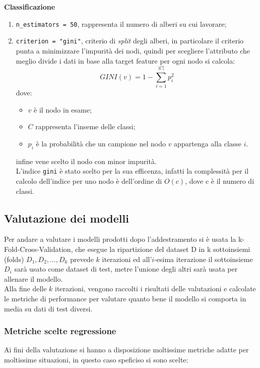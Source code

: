 \documentclass[italian,12pt,a4paper]{article}
\begin{document}
			\textbf{Classificazione}
			
				\begin{enumerate}
					
					\item \texttt{n\_estimators = 50}, rappresenta il numero di alberi su cui lavorare;
					\item  \texttt{criterion = "gini"}, criterio di \textit{split} degli alberi, in particolare il criterio punta a minimizzare l'impurità dei nodi, quindi per scegliere l'attributo che meglio divide i dati in base alla target feature per ogni nodo si calcola:
					$$GINI(v) = 1-\sum_{i = 1}^{|C|}p_i^2$$
					dove:
					\begin{itemize}
						\item $v$ è il nodo in esame;
						\item $C$ rappresenta l'inseme delle classi;
						\item $p_i$ è la probabilità che un campione nel nodo $v$ appartenga alla classe $i$.
					\end{itemize}
					infine vene scelto il nodo con minor impurità. \\
					\linebreak
					L'indice \texttt{gini} è stato scelto per la sua efficenza, infatti la complessità per il calcolo dell'indice per uno nodo è dell'ordine di $O(c)$, dove c è il numero di classi.
					
				\end{enumerate}
				
		\subsection{Valutazione dei modelli}
			Per andare a valutare i modelli prodotti dopo l'addestramento si è usata la k-Fold-Cross-Validation, che esegue la ripartizione del dataset D in k sottoinsiemi (folds) $D_1, D_2, \dots , D_k$ prevede $k$ iterazioni ed all'$i$-esima iterazione il sottoinsieme $D_i$ sarà usato come dataset di test, metre l'unione degli altri sarà usata per allenare il modello. \\
			\linebreak
			Alla fine delle $k$ iterazioni, vengono raccolti i risultati delle valutazioni e calcolate le metriche di performance per valutare quanto bene il modello si comporta in media su dati di test diversi.
			
			\subsubsection{Metriche scelte regressione}
				Ai fini della valutazione si hanno a disposizione moltissime metriche adatte per moltissime situazioni, in questo caso speficiso si sono scelte:
	
\end{document}
